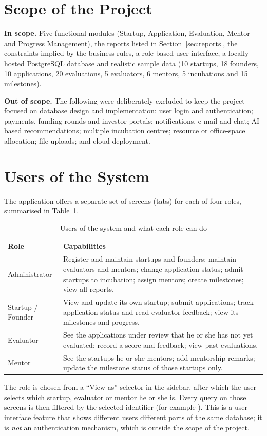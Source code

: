 \section{Scope of the Project}
\label{sec:scope}
\textbf{In scope.} Five functional modules (Startup, Application, Evaluation, Mentor and
Progress Management), the reports listed in Section~\ref{sec:reports}, the constraints implied
by the business rules, a role-based user interface, a locally hosted PostgreSQL database and
realistic sample data (10 startups, 18 founders, 10 applications, 20 evaluations, 5 evaluators,
6 mentors, 5 incubations and 15 milestones).

\textbf{Out of scope.} The following were deliberately excluded to keep the project focused on
database design and implementation: user login and authentication; payments, funding rounds
and investor portals; notifications, e-mail and chat; AI-based recommendations; multiple
incubation centres; resource or office-space allocation; file uploads; and cloud deployment.

\section{Users of the System}
\label{sec:users}
The application offers a separate set of screens (tabs) for each of four roles,
summarised in Table~\ref{tab:users}.

\begin{table}[H]
  \centering
  \caption{Users of the system and what each role can do}
  \label{tab:users}
  \begin{tabularx}{\textwidth}{@{}lX@{}}
    \toprule
    \textbf{Role} & \textbf{Capabilities} \\
    \midrule
    Administrator      & Register and maintain startups and founders; maintain evaluators and
                         mentors; change application status; admit startups to incubation;
                         assign mentors; create milestones; view all reports. \\
    Startup / Founder  & View and update its own startup; submit applications; track
                         application status and read evaluator feedback; view its milestones
                         and progress. \\
    Evaluator          & See the applications under review that he or she has not yet
                         evaluated; record a score and feedback; view past evaluations. \\
    Mentor             & See the startups he or she mentors; add mentorship remarks; update
                         the milestone status of those startups only. \\
    \bottomrule
  \end{tabularx}
\end{table}

The role is chosen from a ``View as'' selector in the sidebar, after which the user selects
which startup, evaluator or mentor he or she is. Every query on those screens is then filtered
by the selected identifier (for example ). This is a user
interface feature that shows different users different parts of the same database; it is
\emph{not} an authentication mechanism, which is outside the scope of the project.
